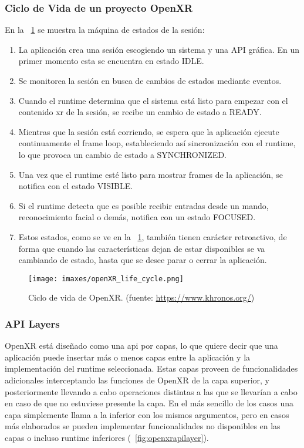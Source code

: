 \subsubsection{Ciclo de Vida de un proyecto OpenXR}
En la \figurename~\ref{fig:openxrlifecycle} se muestra la máquina de estados de la sesión:
\begin{enumerate}
    \item La aplicación crea una sesión escogiendo un sistema y una API gráfica. En un primer momento esta se encuentra en estado IDLE.
    \item Se monitorea la sesión en busca de cambios de estados mediante eventos.
    \item Cuando el runtime determina que el sistema está listo para empezar con el contenido \acrshort{xr} de la sesión, se recibe un cambio de estado a READY.
    \item Mientras que la sesión está corriendo, se espera que la aplicación ejecute continuamente el frame loop, estableciendo así sincronización con el runtime, lo que provoca un cambio de estado a SYNCHRONIZED.
    \item Una vez que el runtime esté listo para mostrar frames de la aplicación, se notifica con el estado VISIBLE.
    \item Si el runtime detecta que es posible recibir entradas desde un mando, reconocimiento facial o demás, notifica con un estado FOCUSED.
    \item Estos estados, como se ve en la \figurename~\ref{fig:openxrlifecycle}, también tienen carácter retroactivo, de forma que cuando las características dejan de estar disponibles se va cambiando de estado, hasta que se desee parar o cerrar la aplicación.
    
\end{enumerate}

\begin{figure}
  \centering
  \texttt{[image: imaxes/openXR\_life\_cycle.png]}
  \caption{Ciclo de vida de OpenXR. (fuente: \href{https://www.khronos.org/}{https://www.khronos.org/})}
  \label{fig:openxrlifecycle}
\end{figure}

\subsubsection{API Layers}
OpenXR está diseñado como una \acrshort{api} por capas, lo que quiere decir que una aplicación puede insertar más o menos capas entre la aplicación y la implementación del runtime seleccionada. Estas capas proveen de funcionalidades adicionales interceptando las funciones de OpenXR de la capa superior, y posteriormente llevando a cabo operaciones distintas a las que se llevarían a cabo en caso de que no estuviese presente la capa. En el más sencillo de los casos una capa simplemente llama a la inferior con los mismos argumentos, pero en casos más elaborados se pueden implementar funcionalidades no disponibles en las capas o incluso runtime inferiores (\figurename~\ref{fig:openxrapilayer}).

